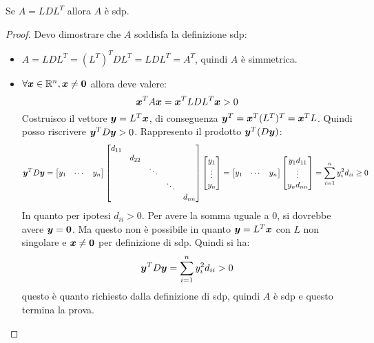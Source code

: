 \begin{exercise}[3.10]
Se $A = LDL^{T}$ allora $A$ \`e sdp.
\end{exercise}
\begin{proof}
Devo dimostrare che $A$ soddisfa la definizione sdp:
\begin{itemize}
\item $A = LDL^{T} = (L^{T})^{T}DL^{T} = LDL^{T} = A^{T}$, quindi $A$ \`e
simmetrica.
\item $\forall \boldsymbol{x} \in \mathbb{R}^{n}, \boldsymbol{x} \not = \boldsymbol{0}$ allora
deve valere:
\begin{displaymath}
\boldsymbol{x}^{T}A\boldsymbol{x} = \boldsymbol{x}^{T}LDL^{T}\boldsymbol{x} > 0
\end{displaymath}
Costruisco il vettore $\boldsymbol{y} = L^{T}\boldsymbol{x}$, di conseguenza $\boldsymbol{y}^{T}
= \boldsymbol{x}^{T}(L^{T})^{T} = \boldsymbol{x}^{T}L$. Quindi posso riscrivere
$\boldsymbol{y}^{T}D\boldsymbol{y} > 0$. Rappresento il prodotto $\boldsymbol{y}^{T}(D\boldsymbol{y})$:
\begin{displaymath}
\boldsymbol{y}^{T} D \boldsymbol{y} = 
\begin{bmatrix}
y_{1} & \cdots & y_{n}
\end{bmatrix}
\begin{bmatrix}
d_{11} \\
 & d_{22} \\
 & 		& \ddots \\
 & 		&		& \ddots\\
 &  	&  		&		& d_{nn}
\end{bmatrix}
\begin{bmatrix}
y_{1}\\
\vdots \\
y_{n}
\end{bmatrix} = 
\begin{bmatrix}
y_{1} & \cdots & y_{n}
\end{bmatrix}
\begin{bmatrix}
y_{1}d_{11}\\
\vdots \\
y_{n}d_{nn}
\end{bmatrix} =
\sum_{i = 1}^{n}{y_{i}^{2}d_{ii}} \geq 0
\end{displaymath} 
In quanto per ipotesi $d_{ii} > 0$. Per avere la somma uguale a 0, si dovrebbe
avere $\boldsymbol{y} = \boldsymbol{0}$. Ma questo non \`e possibile in quanto $\boldsymbol{y}  
= L^{T}\boldsymbol{x}$ con $L$ non singolare e $\boldsymbol{x} \not = \boldsymbol{0}$ per
definizione di sdp. Quindi si ha:
\begin{displaymath}
\boldsymbol{y}^{T} D \boldsymbol{y} = \sum_{i = 1}^{n}{y_{i}^{2}d_{ii}} > 0
\end{displaymath} 
questo \`e quanto richiesto dalla definizione di sdp, quindi $A$ \`e sdp e
questo termina la prova.
\end{itemize}
\end{proof}

